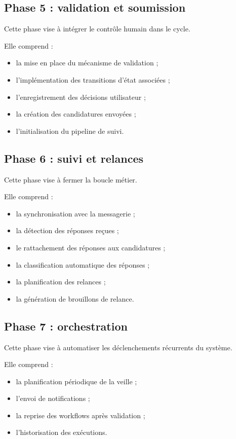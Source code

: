\documentclass[11pt,a4paper]{article}
\begin{document}
\subsection{Phase 5 : validation et soumission}

Cette phase vise à intégrer le contrôle humain dans le cycle.

Elle comprend :

\begin{itemize}
    \item la mise en place du mécanisme de validation ;
    \item l’implémentation des transitions d’état associées ;
    \item l’enregistrement des décisions utilisateur ;
    \item la création des candidatures envoyées ;
    \item l’initialisation du pipeline de suivi.
\end{itemize}

\subsection{Phase 6 : suivi et relances}

Cette phase vise à fermer la boucle métier.

Elle comprend :

\begin{itemize}
    \item la synchronisation avec la messagerie ;
    \item la détection des réponses reçues ;
    \item le rattachement des réponses aux candidatures ;
    \item la classification automatique des réponses ;
    \item la planification des relances ;
    \item la génération de brouillons de relance.
\end{itemize}

\subsection{Phase 7 : orchestration}

Cette phase vise à automatiser les déclenchements récurrents du système.

Elle comprend :

\begin{itemize}
    \item la planification périodique de la veille ;
    \item l’envoi de notifications ;
    \item la reprise des workflows après validation ;
    \item l’historisation des exécutions.
\end{itemize}
\end{document}
